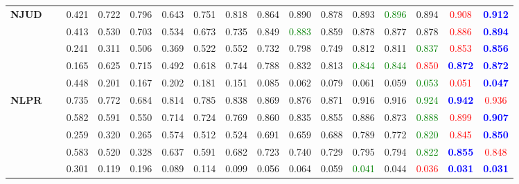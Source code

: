 \documentclass[runningheads]{llncs}
\begin{document}
\begin{table*}[tp]
{\begin{tabular}{lllccccccccccccc}
	\multirow{5}{*}{\textbf{NJUD}~\cite{3DACSD}}
&		&0.421	&0.722	&0.796	&0.643	&0.751	&0.818	&0.864	&0.890	&0.878	&0.893	&\textcolor{green}{0.896}	&0.894	&\textcolor{red}{0.908}	&\textbf{\textcolor{blue}{0.912}}\\
&	&0.413	&0.530	&0.703	&0.534	&0.673	&0.735	&0.849	&\textcolor{green}{0.883}	&0.859	&0.878	&0.877	&0.878	&\textcolor{red}{0.886}	&\textbf{\textcolor{blue}{0.894}}\\
&				&0.241	&0.311	&0.506	&0.369	&0.522	&0.552	&0.732	&0.798	&0.749	&0.812	&0.811	&\textcolor{green}{0.837}	&\textcolor{red}{0.853}	&\textbf{\textcolor{blue}{0.856}}\\
&	&0.165	&0.625	&0.715	&0.492	&0.618	&0.744	&0.788	&0.832	&0.813	&\textcolor{green}{0.844}	&\textcolor{green}{0.844}	&\textcolor{red}{0.850}	&\textbf{\textcolor{blue}{0.872}}	&\textbf{\textcolor{blue}{0.872}}\\
&		&0.448	&0.201	&0.167	&0.202	&0.181	&0.151	&0.085	&0.062	&0.079	&0.061	&0.059	&\textcolor{green}{0.053}	&\textcolor{red}{0.051}	&\textbf{\textcolor{blue}{0.047}}\\
										\cmidrule(r){1-16}
	\multirow{5}{*}{\textbf{NLPR}~\cite{3DNLPR}}
&		&0.735	&0.772	&0.684	&0.814	&0.785	&0.838	&0.869	&0.876	&0.871	&0.916	&0.916	&\textcolor{green}{0.924}	&\textbf{\textcolor{blue}{0.942}}	&\textcolor{red}{0.936}\\
&	&0.582	&0.591	&0.550	&0.714	&0.724	&0.769	&0.860	&0.835	&0.855	&0.886	&0.873	&\textcolor{green}{0.888}	&\textcolor{red}{0.899}	&\textbf{\textcolor{blue}{0.907}}\\
&			&0.259	&0.320	&0.265	&0.574	&0.512	&0.524	&0.691	&0.659	&0.688	&0.789	&0.772	&\textcolor{green}{0.820}	&\textcolor{red}{0.845}	&\textbf{\textcolor{blue}{0.850}}\\
&	&0.583	&0.520	&0.328	&0.637	&0.591	&0.682	&0.723	&0.740	&0.729	&0.795	&0.794	&\textcolor{green}{0.822}	&\textbf{\textcolor{blue}{0.855}}	&\textcolor{red}{0.848}\\
&		&0.301	&0.119	&0.196	&0.089	&0.114	&0.099	&0.056	&0.064	&0.059	&\textcolor{green}{0.041}	&0.044	&\textcolor{red}{0.036}	&\textbf{\textcolor{blue}{0.031}}	&\textbf{\textcolor{blue}{0.031}}	\\

									\cmidrule(r){1-16}
									

\end{tabular}}
\end{table*}
\end{document}
